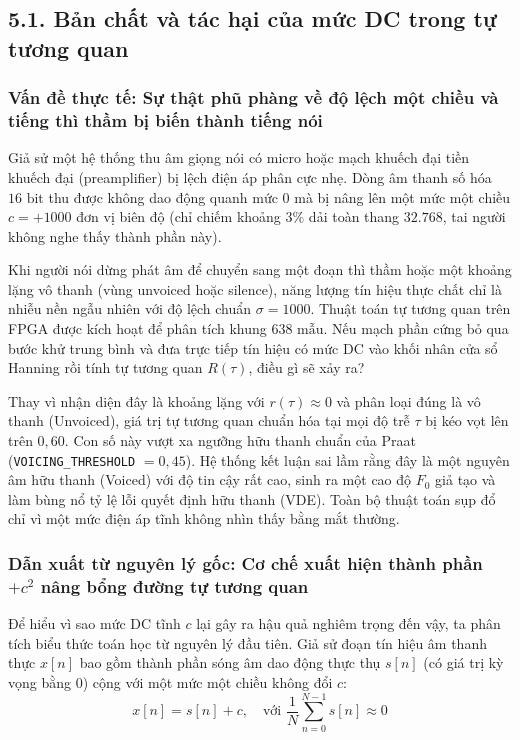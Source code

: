 \subsection*{5.1. Bản chất và tác hại của mức DC trong tự tương quan}

\subsubsection*{Vấn đề thực tế: Sự thật phũ phàng về độ lệch một chiều và tiếng thì thầm bị biến thành tiếng nói}
Giả sử một hệ thống thu âm giọng nói có micro hoặc mạch khuếch đại tiền khuếch đại (preamplifier) bị lệch điện áp phân cực nhẹ. Dòng âm thanh số hóa $16\text{ bit}$ thu được không dao động quanh mức $0$ mà bị nâng lên một mức một chiều $c = +1000$ đơn vị biên độ (chỉ chiếm khoảng $3\%$ dải toàn thang $32.768$, tai người không nghe thấy thành phần này). 

Khi người nói dừng phát âm để chuyển sang một đoạn thì thầm hoặc một khoảng lặng vô thanh (vùng unvoiced hoặc silence), năng lượng tín hiệu thực chất chỉ là nhiễu nền ngẫu nhiên với độ lệch chuẩn $\sigma = 1000$. Thuật toán tự tương quan trên FPGA được kích hoạt để phân tích khung $638\text{ mẫu}$. Nếu mạch phần cứng bỏ qua bước khử trung bình và đưa trực tiếp tín hiệu có mức DC vào khối nhân cửa sổ Hanning rồi tính tự tương quan $R(\tau)$, điều gì sẽ xảy ra?

Thay vì nhận diện đây là khoảng lặng với $r(\tau) \approx 0$ và phân loại đúng là vô thanh (Unvoiced), giá trị tự tương quan chuẩn hóa tại mọi độ trễ $\tau$ bị kéo vọt lên trên $0{,}60$. Con số này vượt xa ngưỡng hữu thanh chuẩn của Praat (\texttt{VOICING\_THRESHOLD} $= 0{,}45$). Hệ thống kết luận sai lầm rằng đây là một nguyên âm hữu thanh (Voiced) với độ tin cậy rất cao, sinh ra một cao độ $F_0$ giả tạo và làm bùng nổ tỷ lệ lỗi quyết định hữu thanh (VDE). Toàn bộ thuật toán sụp đổ chỉ vì một mức điện áp tĩnh không nhìn thấy bằng mắt thường.

\subsubsection*{Dẫn xuất từ nguyên lý gốc: Cơ chế xuất hiện thành phần $+c^2$ nâng bổng đường tự tương quan}
Để hiểu vì sao mức DC tĩnh $c$ lại gây ra hậu quả nghiêm trọng đến vậy, ta phân tích biểu thức toán học từ nguyên lý đầu tiên. Giả sử đoạn tín hiệu âm thanh thực $x[n]$ bao gồm thành phần sóng âm dao động thực thụ $s[n]$ (có giá trị kỳ vọng bằng $0$) cộng với một mức một chiều không đổi $c$:
\begin{equation}
x[n] = s[n] + c, \quad \text{với } \frac{1}{N} \sum_{n=0}^{N-1} s[n] \approx 0
\end{equation}

